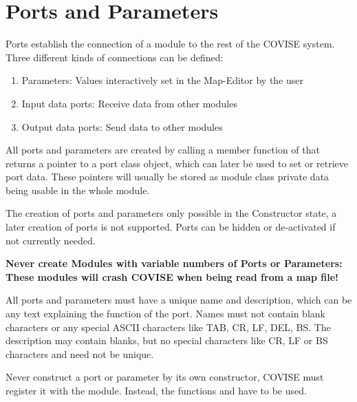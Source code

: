 \section{Ports and Parameters}

Ports establish the connection of a module to the rest of the COVISE system. Three 
different kinds of connections can be defined:

\begin{enumerate}
\item Parameters:        Values interactively set in the Map-Editor by the user 
\item Input data ports:  Receive data from other modules
\item Output data ports: Send data to other modules
\end{enumerate}

All ports and parameters are created by calling a member function of 
that returns a pointer to a port class object, which can later be used to set or 
retrieve port data. These pointers will usually be stored as module
class private data being usable in the whole module. 

The creation of ports and parameters only possible in the Constructor state, a later 
creation of ports is not supported. Ports can be hidden or de-activated if not currently
needed.

\vspace*{0.5cm}

\textbf{Never create Modules with variable numbers of Ports or Parameters: 
These modules will crash COVISE when being read from a map file!}

\vspace*{0.5cm}


All ports and parameters must have a unique name and description, which can be any text 
explaining the function of the port. Names must not contain blank characters or any 
special ASCII characters like TAB, CR, LF, DEL, BS. The description may contain blanks, 
but no special characters like CR, LF or BS characters and need not be unique.

Never construct a port or parameter by its own constructor, COVISE must register it with 
the module. Instead, the functions  and  have 
to be used.

